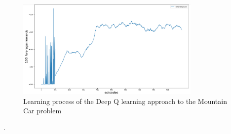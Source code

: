 \begin{figure}[h]
\centering
\includegraphics[width=0.8\textwidth]{LearningProcessDQN.png}
\caption{Learning process of the Deep Q learning approach to the Mountain Car problem}
\label{fig:Learning} 
\end{figure}

.
